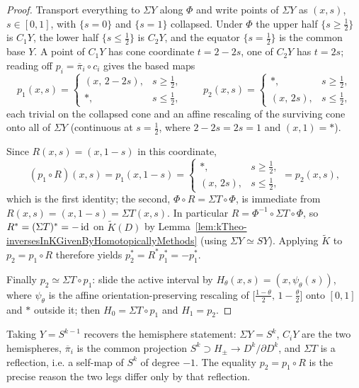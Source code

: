\begin{proof}
Transport everything to $\Sigma Y$ along $\Phi$ and write points of $\Sigma Y$ as $(x,s)$,
$s\in[0,1]$, with $\{s=0\}$ and $\{s=1\}$ collapsed. Under $\Phi$ the upper half
$\{s\ge\frac12\}$ is $C_1Y$, the lower half $\{s\le\frac12\}$ is $C_2Y$, and the equator
$\{s=\frac12\}$ is the common base $Y$. A point of $C_1Y$ has cone coordinate $t=2-2s$, one of
$C_2Y$ has $t=2s$; reading off $p_i=\overline\pi_i\circ c_i$ gives the based maps
\[
  p_1(x,s)=\begin{cases}(x,\,2-2s), & s\ge\tfrac12,\\ \ast, & s\le\tfrac12,\end{cases}
  \qquad
  p_2(x,s)=\begin{cases}\ast, & s\ge\tfrac12,\\ (x,\,2s), & s\le\tfrac12,\end{cases}
\]
each trivial on the collapsed cone and an affine rescaling of the surviving cone onto all of
$\Sigma Y$ (continuous at $s=\tfrac12$, where $2-2s=2s=1$ and $(x,1)=\ast$).

Since $R(x,s)=(x,1-s)$ in this coordinate,
\[
  (p_1\circ R)(x,s)=p_1(x,1-s)
  =\begin{cases}\ast, & s\ge\tfrac12,\\ (x,\,2s), & s\le\tfrac12,\end{cases}
  =p_2(x,s),
\]
which is the first identity; the second, $\Phi\circ R=\Sigma T\circ\Phi$, is immediate from
$R(x,s)=(x,1-s)=\Sigma T(x,s)$. In particular $R=\Phi^{-1}\circ\Sigma T\circ\Phi$, so
$R^{*}=(\Sigma T)^{*}=-\operatorname{\mathrm{id}}$ on $\tilde K(D)$ by
Lemma~\ref{lem:kTheo-inversesInKGivenByHomotopicallyMethods} (using $\Sigma Y\simeq SY$).
Applying $\tilde K$ to $p_2=p_1\circ R$ therefore yields
$p_2^{*}=R^{*}p_1^{*}=-p_1^{*}$.

Finally $p_2\simeq\Sigma T\circ p_1$: slide the active interval by
$H_\theta(x,s)=(x,\psi_\theta(s))$, where $\psi_\theta$ is the affine orientation-preserving
rescaling of $\bigl[\tfrac{1-\theta}{2},\,1-\tfrac{\theta}{2}\bigr]$ onto $[0,1]$ and $\ast$
outside it; then $H_0=\Sigma T\circ p_1$ and $H_1=p_2$.
\end{proof}

\begin{remark}
Taking $Y=S^{k-1}$ recovers the hemisphere statement: $\Sigma Y=S^{k}$,
$C_iY$ are the two hemispheres, $\overline\pi_i$ is the common projection $S^k\supset H_\pm\to D^k/\partial D^k$,
and $\Sigma T$ is a reflection, i.e. a self-map of $S^k$ of degree $-1$. The equality $p_2=p_1\circ R$
is the precise reason the two legs differ only by that reflection.
\end{remark}